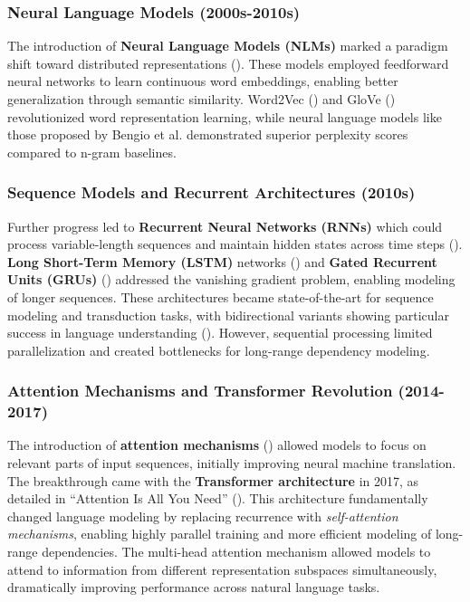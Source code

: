 \subsubsection{Neural Language Models (2000s-2010s)}
The introduction of \textbf{Neural Language Models (NLMs)} marked a paradigm shift toward distributed representations (\citep{bengio2003neural}). These models employed feedforward neural networks to learn continuous word embeddings, enabling better generalization through semantic similarity. Word2Vec (\citep{mikolov2013word2vec}) and GloVe (\citep{pennington2014glove}) revolutionized word representation learning, while neural language models like those proposed by Bengio et al. demonstrated superior perplexity scores compared to n-gram baselines.

\subsubsection{Sequence Models and Recurrent Architectures (2010s)}
Further progress led to \textbf{Recurrent Neural Networks (RNNs)} which could process variable-length sequences and maintain hidden states across time steps (\citep{elman1990finding}). \textbf{Long Short-Term Memory (LSTM)} networks (\citep{hochreiter1997lstm}) and \textbf{Gated Recurrent Units (GRUs)} (\citep{cho2014gru}) addressed the vanishing gradient problem, enabling modeling of longer sequences. These architectures became state-of-the-art for sequence modeling and transduction tasks, with bidirectional variants showing particular success in language understanding (\citep{graves2005bidirectional}). However, sequential processing limited parallelization and created bottlenecks for long-range dependency modeling.

\subsubsection{Attention Mechanisms and Transformer Revolution (2014-2017)}
The introduction of \textbf{attention mechanisms} (\citep{bahdanau2014attention}) allowed models to focus on relevant parts of input sequences, initially improving neural machine translation. The breakthrough came with the \textbf{Transformer architecture} in 2017, as detailed in ``Attention Is All You Need'' (\citep{vaswani2017attention}). This architecture fundamentally changed language modeling by replacing recurrence with \textit{self-attention mechanisms}, enabling highly parallel training and more efficient modeling of long-range dependencies. The multi-head attention mechanism allowed models to attend to information from different representation subspaces simultaneously, dramatically improving performance across natural language tasks.

